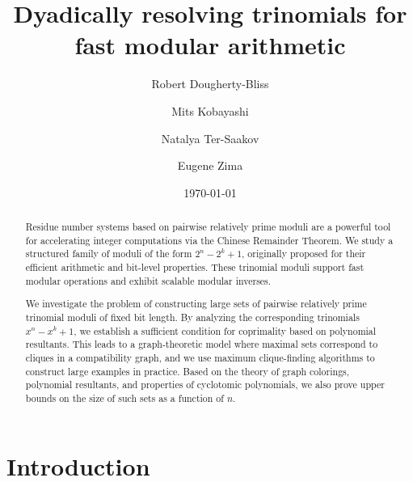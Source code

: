 \documentclass[]{article}
\title{Dyadically resolving trinomials for fast modular arithmetic}
\author{Robert Dougherty-Bliss \and Mits Kobayashi \and Natalya Ter-Saakov \and Eugene Zima}
\date{\today}
\theoremstyle{definition}
\begin{document}
\maketitle

\begin{abstract}
    Residue number systems based on pairwise relatively prime moduli are a
    powerful tool for accelerating integer computations via the Chinese
    Remainder Theorem. We study a structured family of moduli of the form $2^n -
    2^k + 1$, originally proposed for their efficient arithmetic and bit-level
    properties. These trinomial moduli support fast modular operations and
    exhibit scalable modular inverses.

    We investigate the problem of constructing large sets of pairwise
    relatively prime trinomial moduli of fixed bit length. By analyzing the
    corresponding trinomials $x^n - x^k + 1$, we establish a sufficient
    condition for coprimality based on polynomial resultants. This leads to a
    graph-theoretic model where maximal sets correspond to cliques in a
    compatibility graph, and we use maximum clique-finding algorithms to
    construct large examples in practice. Based on the theory of graph
    colorings, polynomial resultants, and properties of cyclotomic polynomials,
    we also prove upper bounds on the size of such sets as a function of $n$.
\end{abstract}

\section{Introduction}
\end{document}
